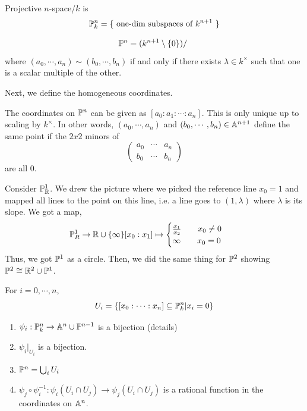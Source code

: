 \documentclass[12pt]{amsart}
\begin{document}
\begin{definition}
    Projective $n$-space/$k$ is 
    \[ \P^n_k = \{ \text{ one-dim subspaces of $k^{n+1}$ }\}\]
\end{definition}

\begin{lemma}
    \[ \P^n = (k^{n+1}\setminus \{0\})/~\]
    where $(a_0, \cdots, a_n) \sim (b_0, \cdots, b_n)$ if and only if there exists $\lambda \in k^\times$ such that one is a scalar multiple of the other. 
\end{lemma}

Next, we define the homogeneous coordinates. 
\begin{definition}
    The coordinates on $\P^n$ can be given as $[a_0 : a_1 : \cdots : a_n]$. This is only unique up to scaling by $k^\times$. In other words, $(a_0, \cdots, a_n)$ and $(b_0, \cdots, b_n) \in \A^{n+1}$ define the same point if the $2x2$ minors of 
    \[ \begin{pmatrix} 
        a_0 & \cdots & a_n \\ 
        b_0 & \cdots & b_n 
    \end{pmatrix} \] 
    are all $0$. 
\end{definition}

\begin{example}
    Consider $\P^1_\R$. We drew the picture where we picked the reference line $x_0 = 1$ and mapped all lines to the point on this line, i.e. a line goes to $(1, \lambda)$ where $\lambda$ is its slope. We got a map, 
    \begin{align*}
        \P^1_R &\to \R \cup \{\infty\} 
        [x_0 : x_1] \mapsto \begin{cases}
            \frac{x_1}{x_2} \qquad x_0 \neq 0 \\
            \infty \qquad x_0 = 0
        \end{cases}
    \end{align*}
    Thus, we got $\P^1$ as a circle. Then, we did the same thing for $\P^2$ showing $\P^2 \cong \R^2 \cup \P^1$. 
\end{example}

\begin{lemma}
    For $i = 0, \cdots, n$, 
    \[ U_i = \{ [x_0 : \cdots : x_n ] \subseteq \P^n_k | x_i = 0\}\]
    \begin{enumerate}
        \item $\psi_i : \P^n_k \to \A^n \cup \P^{n-1}$ is a bijection (details)
        \item $\psi_i|_{U_i}$ is a bijection.  
        \item $\P^n = \bigcup_i U_i$
        \item $\psi_j \circ \psi_i^{-1}: \psi_i(U_i \cap U_j) \to \psi_j(U_i \cap U_j)$ is a rational function in the coordinates on $\A^n$. 
    \end{enumerate}
\end{lemma}
\end{document}
